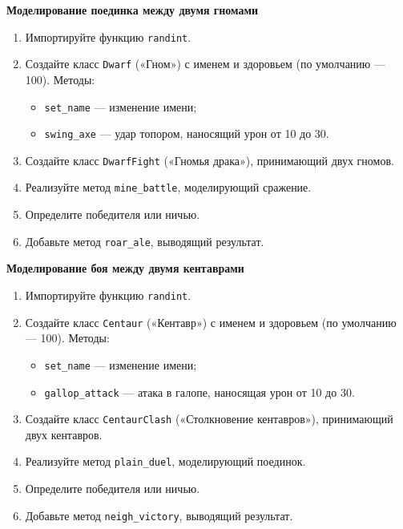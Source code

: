 \item \textbf{Моделирование поединка между двумя гномами}

\begin{enumerate}
    \item Импортируйте функцию \texttt{randint}.

    \item Создайте класс \texttt{Dwarf} («Гном») с именем и здоровьем (по умолчанию — 100).  
    Методы:
    \begin{itemize}
        \item \texttt{set\_name} — изменение имени;
        \item \texttt{swing\_axe} — удар топором, наносящий урон от 10 до 30.
    \end{itemize}

    \item Создайте класс \texttt{DwarfFight} («Гномья драка»), принимающий двух гномов.

    \item Реализуйте метод \texttt{mine\_battle}, моделирующий сражение.

    \item Определите победителя или ничью.

    \item Добавьте метод \texttt{roar\_ale}, выводящий результат.
\end{enumerate}

\item \textbf{Моделирование боя между двумя кентаврами}

\begin{enumerate}
    \item Импортируйте функцию \texttt{randint}.

    \item Создайте класс \texttt{Centaur} («Кентавр») с именем и здоровьем (по умолчанию — 100).  
    Методы:
    \begin{itemize}
        \item \texttt{set\_name} — изменение имени;
        \item \texttt{gallop\_attack} — атака в галопе, наносящая урон от 10 до 30.
    \end{itemize}

    \item Создайте класс \texttt{CentaurClash} («Столкновение кентавров»), принимающий двух кентавров.

    \item Реализуйте метод \texttt{plain\_duel}, моделирующий поединок.

    \item Определите победителя или ничью.

    \item Добавьте метод \texttt{neigh\_victory}, выводящий результат.
\end{enumerate}

